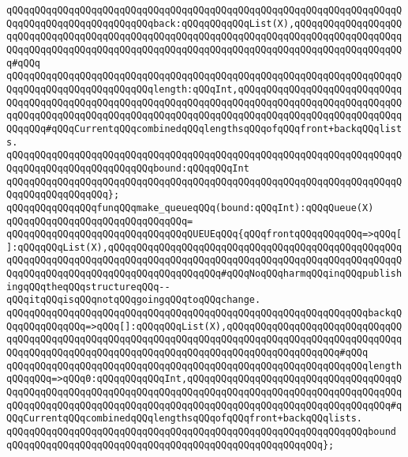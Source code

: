 \verb|qQQqqQQqqQQqqQQqqQQqqQQqqQQqqQQqqQQqqQQqqQQqqQQqqQQqqQQqqQQqqQQqqQQqqQQqqQQqqQQqqQQqqQQqqQQqqQQqback:qQQqqQQqqQQqList(X),qQQqqQQqqQQqqQQqqQQqqQQqqQQqqQQqqQQqqQQqqQQqqQQqqQQqqQQqqQQqqQQqqQQqqQQqqQQqqQQqqQQqqQQqqQQqqQQqqQQqqQQqqQQqqQQqqQQqqQQqqQQqqQQqqQQqqQQqqQQqqQQqqQQqqQQqqQQqqQQq#qQQq|\newline
\verb|qQQqqQQqqQQqqQQqqQQqqQQqqQQqqQQqqQQqqQQqqQQqqQQqqQQqqQQqqQQqqQQqqQQqqQQqqQQqqQQqqQQqqQQqqQQqqQQqlength:qQQqInt,qQQqqQQqqQQqqQQqqQQqqQQqqQQqqQQqqQQqqQQqqQQqqQQqqQQqqQQqqQQqqQQqqQQqqQQqqQQqqQQqqQQqqQQqqQQqqQQqqQQqqQQqqQQqqQQqqQQqqQQqqQQqqQQqqQQqqQQqqQQqqQQqqQQqqQQqqQQqqQQqqQQqqQQqqQQqqQQq#qQQqCurrentqQQqcombinedqQQqlengthsqQQqofqQQqfront+backqQQqlists.|\newline
\verb|qQQqqQQqqQQqqQQqqQQqqQQqqQQqqQQqqQQqqQQqqQQqqQQqqQQqqQQqqQQqqQQqqQQqqQQqqQQqqQQqqQQqqQQqqQQqqQQqbound:qQQqqQQqInt|\newline
\verb|qQQqqQQqqQQqqQQqqQQqqQQqqQQqqQQqqQQqqQQqqQQqqQQqqQQqqQQqqQQqqQQqqQQqqQQqqQQqqQQqqQQqqQQq};|\newline
\newline
\verb|qQQqqQQqqQQqqQQqfunqQQqmake_queueqQQq(bound:qQQqInt):qQQqQueue(X)|\newline
\verb|qQQqqQQqqQQqqQQqqQQqqQQqqQQqqQQq=|\newline
\verb|qQQqqQQqqQQqqQQqqQQqqQQqqQQqqQQqQUEUEqQQq{qQQqfrontqQQqqQQqqQQq=>qQQq[]:qQQqqQQqList(X),qQQqqQQqqQQqqQQqqQQqqQQqqQQqqQQqqQQqqQQqqQQqqQQqqQQqqQQqqQQqqQQqqQQqqQQqqQQqqQQqqQQqqQQqqQQqqQQqqQQqqQQqqQQqqQQqqQQqqQQqqQQqqQQqqQQqqQQqqQQqqQQqqQQqqQQqqQQqqQQq#qQQqNoqQQqharmqQQqinqQQqpublishingqQQqtheqQQqstructureqQQq--qQQqitqQQqisqQQqnotqQQqgoingqQQqtoqQQqchange.|\newline
\verb|qQQqqQQqqQQqqQQqqQQqqQQqqQQqqQQqqQQqqQQqqQQqqQQqqQQqqQQqqQQqqQQqbackqQQqqQQqqQQqqQQq=>qQQq[]:qQQqqQQqList(X),qQQqqQQqqQQqqQQqqQQqqQQqqQQqqQQqqQQqqQQqqQQqqQQqqQQqqQQqqQQqqQQqqQQqqQQqqQQqqQQqqQQqqQQqqQQqqQQqqQQqqQQqqQQqqQQqqQQqqQQqqQQqqQQqqQQqqQQqqQQqqQQqqQQqqQQqqQQqqQQq#qQQq|\newline
\verb|qQQqqQQqqQQqqQQqqQQqqQQqqQQqqQQqqQQqqQQqqQQqqQQqqQQqqQQqqQQqqQQqlengthqQQqqQQq=>qQQq0:qQQqqQQqqQQqInt,qQQqqQQqqQQqqQQqqQQqqQQqqQQqqQQqqQQqqQQqqQQqqQQqqQQqqQQqqQQqqQQqqQQqqQQqqQQqqQQqqQQqqQQqqQQqqQQqqQQqqQQqqQQqqQQqqQQqqQQqqQQqqQQqqQQqqQQqqQQqqQQqqQQqqQQqqQQqqQQqqQQqqQQqqQQqqQQq#qQQqCurrentqQQqcombinedqQQqlengthsqQQqofqQQqfront+backqQQqlists.|\newline
\verb|qQQqqQQqqQQqqQQqqQQqqQQqqQQqqQQqqQQqqQQqqQQqqQQqqQQqqQQqqQQqqQQqbound|\newline
\verb|qQQqqQQqqQQqqQQqqQQqqQQqqQQqqQQqqQQqqQQqqQQqqQQqqQQqqQQq};|\newline
